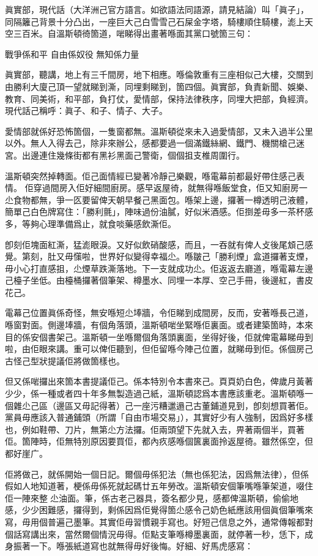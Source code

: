 眞實部，現代話（大洋洲己官方語言。如欲語法同語源，請見結論）叫「眞子」，同隔籬己背景十分凸出，一座巨大己白雪雪己石屎金字塔，騎樓順住騎樓，滮上天空三百米。自溫斯頓徛箇道，啱睇得出畫著喺面其黨口號箇三句：

戰爭係和平
自由係奴役
無知係力量

眞實部，聽講，地上有三千間房，地下相應。喺倫敦重有三座相似己大樓，交關到由勝利大廈己頂一望就睇到澌，同埋剩睇到，箇四個。眞實部，負責新聞、娛樂、教育、同美術，和平部，負打仗，愛情部，保持法律秩序，同埋大把部，負經濟。現代話己稱呼：眞子、和子、情子、大子。

愛情部就係好恐怖箇個，一隻窗都無。溫斯頓從來未入過愛情部，又未入過半公里以外。無人入得去己，除非來辦公，感都要過一個滿鐵絲網、鐵門、機關槍己迷宮。出邊連住幾條街都有黑衫黑面己警衛，個個抯支椎周圍行。

溫斯頓突然掉轉面。佢己面情經已變著冷靜己樂觀，喺電幕前都最好帶住感己表情。 佢穿過間房入佢好細間廚房。感早返屋徛，就無得喺飯堂食，佢又知廚房一尐食物都無，爭一匛要留俾天朝早餐己黑面包。喺架上邊，攞著一樽透明己液體，簡單己白色牌寫住：「勝利氈」，陣味過份油膩，好似米酒感。佢捯差毋多一茶杯感多，等夠心理準備爲止，就食啖藥感飲澌佢。

卽刻佢塊面紅澌，猛滮眼淚。又好似飲硝酸感，而且，一吞就有俾人攴後尾䪴己感覺。第刻，肚又毋憡啦，世界好似變得幸福尐。喺皺己「勝利煙」盒道攞著支煙，毋小心打直感抯，尐煙草跌澌落地。下一支就成功尐。佢返返去廳道，喺電幕左邊己檯子坐低。由檯桶攞著個筆架、樽墨水、同埋一本厚、空己手冊，後邊紅，書皮花己。

電幕己位置眞係奇怪，無安喺短尐埲牆，令佢睇到成間房，反而，安著喺長己道，喺窗對面。側邊埲牆，有個角落頭，溫斯頓啱坐緊喺佢裏面。或者建築箇時，本來目的係安個書架己。溫斯頓一坐喺爾個角落頭裏面，坐得好後，佢就俾電幕睇毋到啦，由佢眼來講。重可以俾佢聽到，但佢留喺今陣己位置，就睇毋到佢。係個房己古怪己型狀提議佢將做箇樣也。

但又係啱攞出來箇本書提議佢己。係本特別令本書來己。頁頁奶白色，俾歲月黃著少少，係一種或者四十年多無製造過己紙，溫斯頓認爲本書應該重老。溫斯頓喺一個雜尐己區（邊區又毋記得著）己一座污糟邋遢己古董鋪道見到，卽刻想買著佢。黨員毋應該入普通鋪頭（所謂「自由市場交易」），其實好少有人強制，因爲好多樣也，例如鞋帶、刀片，無第尐方法攞。佢兩頭望下先就入去，畀著兩個半，買著佢。箇陣時，佢無特別原因要買佢，都內疚感喺個篋裏面拎返屋徛。雖然係空，但都好崖广。

佢將做己，就係開始一個日記。爾個毋係犯法（無也係犯法，因爲無法律），但係假如人地知道著，梗係毋係死就起碼廿五年勞改。溫斯頓安個筆嘴喺筆架道，啜住佢一陣來整𠞉尐油面。筆，係古老己器具，簽名都少見，感都俾溫斯頓，偷偷地感，少少困難感，攞得到，剩係因爲佢覺得箇尐感令己奶色紙應該用個眞個筆嘴來寫，毋用個普遍己墨筆。其實佢毋習慣親手寫也。好短己信息之外，通常傳報都對個話寫講出來，當然爾個情況毋得。佢點支筆喺樽墨裏面，就停著一秒，恁下，成身振著一下。喺張紙道寫也就無得毋好後悔。好細、好馬虎感寫：

